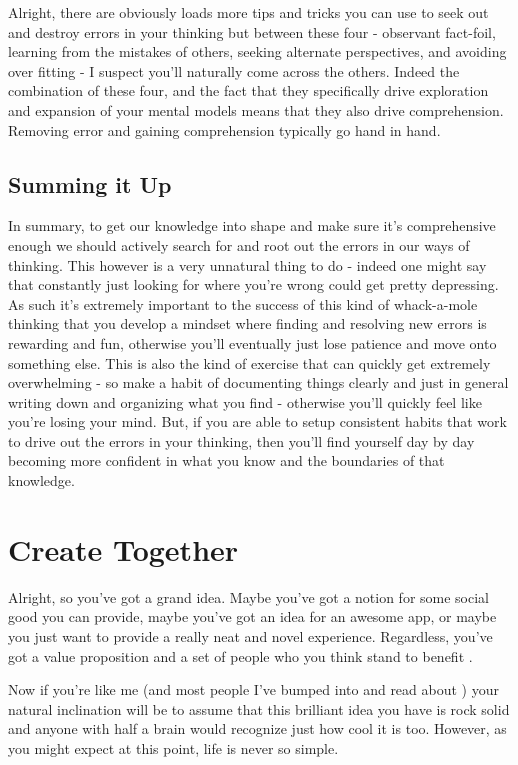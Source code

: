 \documentclass[11pt,a5paper]{book}
\begin{document}
Alright, there are obviously loads more tips and tricks you can use to seek out and destroy errors in your thinking but between these four - observant fact-foil, learning from the mistakes of others, seeking alternate perspectives, and avoiding over fitting - I suspect you'll naturally come across the others. Indeed the combination of these four, and the fact that they specifically drive exploration and expansion of your mental models means that they also drive comprehension. Removing error and gaining comprehension typically go hand in hand. 




\subsection{Summing it Up}
In summary, to get our knowledge into shape and make sure it's comprehensive enough we should actively search for and root out the errors in our ways of thinking. This however is a very unnatural thing to do - indeed one might say that constantly just looking for where you're wrong could get pretty depressing. As such it's extremely important to the success of this kind of whack-a-mole thinking that you develop a mindset where finding and resolving new errors is rewarding and fun, otherwise you'll eventually just lose patience and move onto something else. This is also the kind of exercise that can quickly get extremely overwhelming - so make a habit of documenting things clearly and just in general writing down and organizing what you find - otherwise you'll quickly feel like you're losing your mind. But, if you are able to setup consistent habits that work to drive out the errors in your thinking, then you'll find yourself day by day becoming more confident in what you know and the boundaries of that knowledge.

\section{Create Together}
Alright, so you've got a grand idea. Maybe you've got a notion for some social good you can provide, maybe you've got an idea for an awesome app, or maybe you just want to provide a really neat and novel experience. Regardless, you've got a value proposition and a set of people who you think stand to benefit \cite{valueprop}. 
\newline

Now if you're like me (and most people I've bumped into and read about \cite{patton}) your natural inclination will be to assume that this brilliant idea you have is rock solid and anyone with half a brain would recognize just how cool it is too. However, as you might expect at this point, life is never so simple. 
\newline
\end{document}

